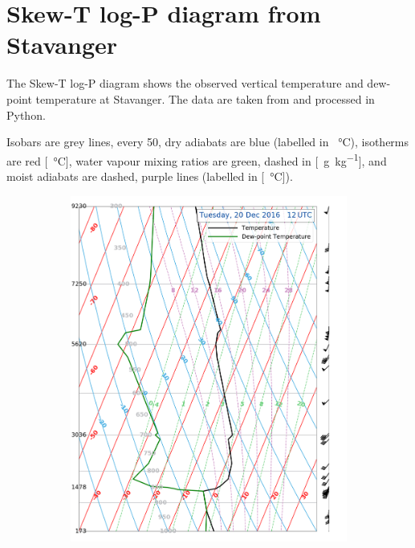 \section{Skew-T log-P diagram from Stavanger}%
\label{app:sounding}
The Skew-T log-P diagram shows the observed vertical temperature and dew-point temperature at Stavanger. The data are taken from \cite{wyoming_atmospheric_2018} and processed in Python.

Isobars are grey lines, every \SI{50}{\hPa}, dry adiabats are blue (labelled in \SI{}{\celsius}), isotherms are red [\SI{}{\celsius}], water vapour mixing ratios are green, dashed in [\SI{}{\gram\per\kilogram}], and moist adiabats are dashed, purple lines (labelled in [\SI{}{\celsius}]).

\begin{landscape}
	\begin{figure}\ContinuedFloat
		\centering
		\begin{subfigure}[b]{0.66\textheight}
			\includegraphics[trim={0cm 0.2cm 2.5cm .5cm},clip,width=\textwidth]{./fig_Sounding/20161220_12Z}

\end{subfigure}
\end{figure}
\end{landscape}
